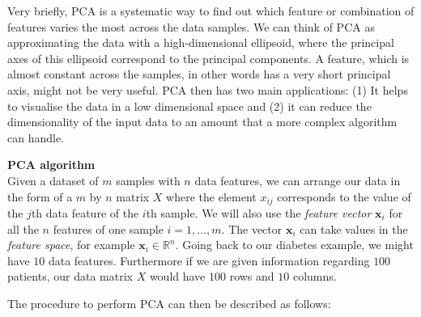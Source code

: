 Very briefly, PCA is a systematic way to find out which feature or combination of features varies the most across the data samples. We can think of PCA as approximating the data with a high-dimensional ellipsoid, where the principal axes of this ellipsoid correspond to the principal components. A feature, which is almost constant across the samples, in other words has a very short principal axis, might not be very useful. PCA then has two main applications: (1) It helps to visualise the data in a low dimensional space and (2) it can reduce the dimensionality of the input data to an amount that a more complex algorithm can handle.
\vspace{12pt}

\noindent
\textbf{PCA algorithm}\vspace{3pt}\\
Given a dataset of $m$ samples with $n$ data features, we can arrange our data in the form of a $m$ by $n$ matrix $X$ where the element $x_{ij}$ corresponds to the value of the $j$th data feature of the $i$th sample. We will also use the \emph{feature vector} $\bm{x}_i$ for all the $n$ features of one sample $i=1,\ldots,m$. The vector $\bm{x}_i$ can take values in the \emph{feature space}, for example $\bm{x}_i \in \mathbb{R}^n$. Going back to our diabetes example, we might have $10$ data features. Furthermore if we are given information regarding $100$ patients, our data matrix $X$ would have $100$ rows and $10$ columns.

The procedure to perform PCA can then be described as follows:

